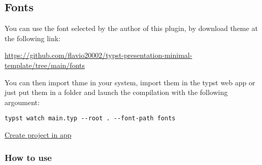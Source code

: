 \begin{Shaded}
\begin{Highlighting}[]


















\end{Highlighting}
\end{Shaded}

\subsection{Fonts}\label{fonts}

You can use the font selected by the author of this plugin, by download
theme at the following link:

\url{https://github.com/flavio20002/typst-presentation-minimal-template/tree/main/fonts}

You can then import thme in your system, import them in the typst web
app or just put them in a folder and launch the compilation with the
following argoument:

\begin{verbatim}
typst watch main.typ --root . --font-path fonts
\end{verbatim}

\href{/app?template=minimal-presentation&version=0.3.0}{Create project
in app}

\subsubsection{How to use}\label{how-to-use}

